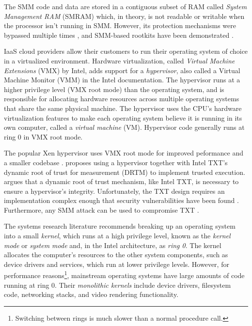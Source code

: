 The SMM code and data are stored in a contiguous subset of RAM called
\textit{System Management RAM} (SMRAM) which, in theory, is not readable or
writable when the processor isn't running in SMM. However, its protection
mechanisms were bypassed multiple times \cite{duflot2006smm}
\cite{rutkowska2008remap} \cite{wojtczuk2009smm}, and SMM-based rootkits have
been demonstrated \cite{wecherowski2009smm} \cite{embleton2010smm}.

IaaS cloud providers allow their customers to run their operating system of
choice in a virtualized environment. Hardware
virtualization\cite{uhlig2005vmx}, called \textit{Virtual Machine Extensions}
(VMX) by Intel, adds support for a \textit{hypervisor}, also called a
Virtual Machine Monitor (VMM) in the Intel documentation. The hypervisor runs
at a higher privilege level (VMX root mode) than the operating system, and is
responsible for allocating hardware resources across multiple operating systems
that share the same physical machine. The hypervisor uses the CPU's hardware
virtualization features to make each operating system believe it is running in
its own computer, called a \textit{virtual machine} (VM). Hypervisor code
generally runs at ring 0 in VMX root mode.

The popular Xen hypervisor uses VMX root mode for improved peformance and a
smaller codebase \cite{zhang2008xen}. \cite{mccune2010trustvisor} proposes
using a hypervisor together with Intel TXT's dynamic root of trust for
measurement (DRTM) to implement trusted execution.
\cite{vasudevan2010requirements} argues that a dynamic root of trust mechanism,
like Intel TXT, is necessary to ensure a hypervisor's integrity. Unfortunately,
the TXT design requires an implementation complex enough that security
vulnerabilities have been found \cite{wojtczuk2009txt2} \cite{wojtczuk2011txt}.
Furthermore, any SMM attack can be used to compromise TXT
\cite{wojtczuk2009txt}.

The systems research literature recommends breaking up an operating system into
a small \textit{kernel}, which runs at a high privilege level, known as the
\textit{kernel mode} or \textit{system mode} and, in the Intel architecture, as
\textit{ring 0}. The kernel allocates the computer's resources to the other
system components, such as device drivers and services, which run at lower
privilege levels. However, for performance reasons\footnote{Switching between
rings is much slower than a normal procedure call.}, mainstream operating
systems have large amounts of code running at ring 0. Their \textit{monolithic
kernels} include device drivers, filesystem code, networking stacks, and video
rendering functionality.

